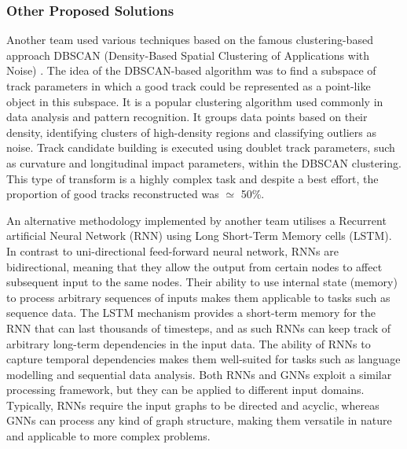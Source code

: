 
\subsubsection{Other Proposed Solutions}

Another team used various techniques based on the famous clustering-based approach DBSCAN (Density-Based Spatial Clustering of Applications with Noise) \cite{dbscan}. The idea of the DBSCAN-based algorithm was to find a subspace of track parameters in which a good track could be represented as a point-like object in this subspace. It is a popular clustering algorithm used commonly in data analysis and pattern recognition. It groups data points based on their density, identifying clusters of high-density regions and classifying outliers as noise. Track candidate building is executed using doublet track parameters, such as curvature and longitudinal impact parameters, within the DBSCAN clustering. This type of transform is a highly complex task and despite a best effort, the proportion of good tracks reconstructed was $\simeq$ 50\%. 

An alternative methodology implemented by another team utilises a Recurrent artificial Neural Network (RNN) using Long Short-Term Memory cells (LSTM). In contrast to uni-directional feed-forward neural network, RNNs are bidirectional, meaning that they allow the output from certain nodes to affect subsequent input to the same nodes. Their ability to use internal state (memory) to process arbitrary sequences of inputs makes them applicable to tasks such as sequence data. The LSTM mechanism provides a short-term memory for the RNN that can last thousands of timesteps, and as such RNNs can keep track of arbitrary long-term dependencies in the input data. The ability of RNNs to capture temporal dependencies makes them well-suited for tasks such as language modelling and sequential data analysis. Both RNNs and GNNs exploit a similar processing framework, but they can be applied to different input domains. Typically, RNNs require the input graphs to be directed and acyclic, whereas GNNs can process any kind of graph structure, making them versatile in nature and applicable to more complex problems.

